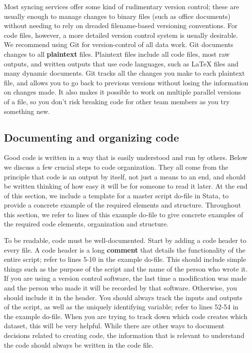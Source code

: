 Most syncing services offer some kind of rudimentary version control;
these are usually enough to manage changes to binary files (such as office documents)
without needing to rely on dreaded filename-based versioning conventions.
For code files, however, a more detailed version control system is usually desirable.
We recommend using Git for version-control of all data work.
Git documents changes to all \textbf{plaintext} files.
Plaintext files include all code files, most raw outputs,
and written outputs that use code languages, 
such as {\LaTeX} files and many dynamic documents.
Git tracks all the changes you make to each plaintext file,
and allows you to go back to previous versions without losing the information on changes made.
It also makes it possible to work on multiple parallel versions of a file,
so you don't risk breaking code for other team members as you try something new.


\subsection{Documenting and organizing code}
Good code is written in a way that is easily understood and run by others.
Below we discuss a few crucial steps to code organization.
They all come from the principle that code is an output by itself,
not just a means to an end,
and should be written thinking of how easy it will be for someone to read it later.
At the end of this section, we include a template for a master script do-file in Stata,
to provide a concrete example of the required elements and structure.
Throughout this section, we refer to lines of this example do-file
to give concrete examples of the required code elements, organization and structure.

To be readable, code must be well-documented.
Start by adding a code header to every file.
A code header is a long \textbf{comment}
that details the functionality of the entire script;
refer to lines 5-10 in the example do-file.
This should include simple things such as
the purpose of the script and the name of the person who wrote it.
If you are using a version control software,
the last time a modification was made and the person who made it will be recorded by that software.
Otherwise, you should include it in the header.
You should always track the inputs and outputs of the script,
as well as the uniquely identifying variable;
refer to lines 52-54 in the example do-file.
When you are trying to track down which code creates which dataset, this will be very helpful.
While there are other ways to document decisions related to creating code,
the information that is relevant to understand the code should always be written in the code file.

